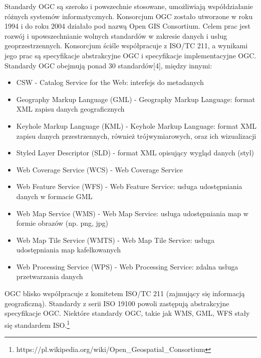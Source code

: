 Standardy OGC są szeroko i powszechnie stosowane, umożliwiają współdziałanie różnych systemów informatycznych.
Konsorcjum OGC zostało utworzone w roku 1994 i do roku 2004 działało pod nazwą Open GIS Consortium. Celem prac jest rozwój i upowszechnianie wolnych standardów w zakresie danych i usług geoprzestrzennych. Konsorcjum ściśle współpracuje z ISO/TC 211, a wynikami jego prac są specyfikacje abstrakcyjne OGC i specyfikacje implementacyjne OGC.
Standardy OGC obejmują ponad 30 standardów[4], między innymi:
\begin{itemize}
	\item CSW - Catalog Service for the Web: interfejs do metadanych
	\item Geography Markup Language (GML) - Geography Markup Language: format XML zapisu danych geograficznych
	\item Keyhole Markup Language (KML) - Keyhole Markup Language: format XML zapisu danych przestrzennych, również trójwymiarowych, oraz ich wizualizacji
	\item Styled Layer Descriptor (SLD) - format XML opisujący wygląd danych (styl)
	\item Web Coverage Service (WCS) - Web Coverage Service
	\item Web Feature Service (WFS) - Web Feature Service: usługa udostępniania danych w formacie GML
	\item Web Map Service (WMS) - Web Map Service: usługa udostępniania map w formie obrazów (np. png, jpg)
	\item Web Map Tile Service (WMTS) - Web Map Tile Service: usługa udostępniania map kafelkowanych
	\item Web Processing Service (WPS) - Web Processing Service: zdalna usługa przetwarzania danych
\end{itemize}
OGC blisko współpracuje z komitetem ISO/TC 211 (zajmujący się informacją geograficzną). Standardy z serii ISO 19100 powoli zastępują abstrakcyjne specyfikacje OGC. Niektóre standardy OGC, takie jak WMS, GML, WFS stały się standardem ISO.\footnote{https://pl.wikipedia.org/wiki/Open\_Geospatial\_Consortium}
